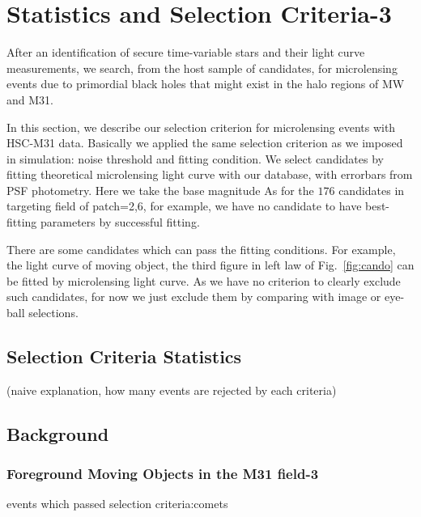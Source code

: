 \documentclass[iop, apj]{emulateapj}
\newcommand{\?}{\stackrel{?}{=}}
\begin{document}
\section{Statistics and Selection Criteria-3}
\label{sec:res2}
After an identification of secure time-variable stars and their light curve measurements, 
we search, from the host sample of candidates, for microlensing events due to primordial black holes that might exist in the halo regions of MW and M31. 


In this section, we describe our selection criterion for microlensing events with HSC-M31 data. 
Basically we applied the same selection criterion as we imposed in simulation: 
noise threshold and fitting condition. 
We select candidates by fitting theoretical microlensing light curve with our database, 
with errorbars from PSF photometry. 
Here we take the base magnitude 
As for the $176$ candidates in targeting field of patch=2,6, for example, we have no candidate 
to have best-fitting parameters by successful fitting. 

There are some candidates which can pass the fitting conditions. 
For example, the light curve of moving object, the third figure in left law of Fig.~\ref{fig:cando} 
can be fitted by microlensing light curve. 
As we have no criterion to clearly exclude such candidates, 
for now we just exclude them by comparing with image or eye-ball selections. 


\subsection{Selection Criteria Statistics}
(naive explanation, how many events are rejected by each criteria)

\subsection{Background}
\subsubsection{Foreground Moving Objects in the M31 field-3}
events which passed selection criteria:comets

\end{document}
